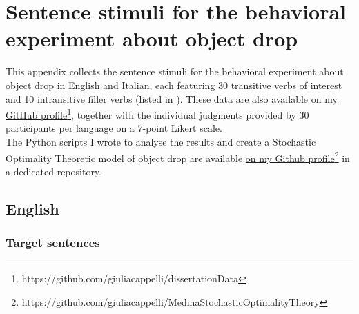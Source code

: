\setchapterpreamble[u]{\margintoc}
\chapter{Sentence stimuli for the behavioral experiment about object drop}

This appendix collects the sentence stimuli for the behavioral experiment about object drop in English and Italian, each featuring 30 transitive verbs of interest and 10 intransitive filler verbs (listed in ). These data are also available \href{https://github.com/giuliacappelli/dissertationData}{on my GitHub profile}\footnote{https://github.com/giuliacappelli/dissertationData}, together with the individual judgments provided by 30 participants per language on a 7-point Likert scale.\\
The Python scripts I wrote to analyse the results and create a Stochastic Optimality Theoretic model of object drop are available \href{https://github.com/giuliacappelli/MedinaStochasticOptimalityTheory}{on my Github profile}\footnote{https://github.com/giuliacappelli/MedinaStochasticOptimalityTheory} in a dedicated repository.



\section{English}

\subsection{Target sentences}

